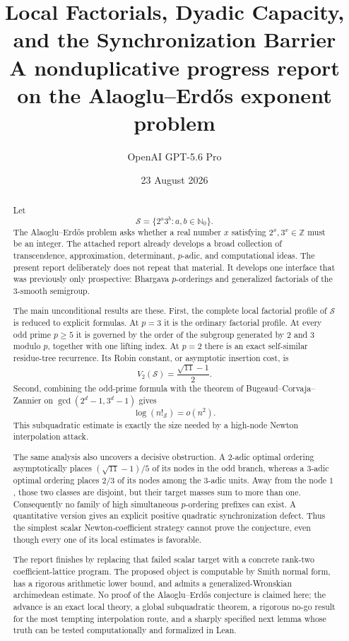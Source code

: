 \documentclass[11pt]{article}
\title{\textbf{Local Factorials, Dyadic Capacity, and the Synchronization Barrier}\\[0.4em]
\large A nonduplicative progress report on the Alaoglu--Erd\H{o}s exponent problem}
\author{OpenAI GPT-5.6 Pro}
\date{23 August 2026}
\theoremstyle{definition}
\theoremstyle{remark}
\newcommand{\N}{\mathbb N}
\newcommand{\Z}{\mathbb Z}
\newcommand{\calS}{\mathcal S}
\begin{document}
\maketitle

\begin{abstract}
Let
\[
   \calS=\{2^a3^b:a,b\in\N_0\}.
\]
The Alaoglu--Erd\H{o}s problem asks whether a real number $x$ satisfying
$2^x,3^x\in\Z$ must be an integer.  The attached report already develops a broad collection of transcendence, approximation, determinant, $p$-adic, and computational ideas.  The present report deliberately does not repeat that material.  It develops one interface that was previously only prospective: Bhargava $p$-orderings and generalized factorials of the $3$-smooth semigroup.

The main unconditional results are these.  First, the complete local factorial profile of $\calS$ is reduced to explicit formulas.  At $p=3$ it is the ordinary factorial profile.  At every odd prime $p\ge5$ it is governed by the order of the subgroup generated by $2$ and $3$ modulo $p$, together with one lifting index.  At $p=2$ there is an exact self-similar residue-tree recurrence.  Its Robin constant, or asymptotic insertion cost, is
\[
        V_2(\calS)=\frac{\sqrt{11}-1}{2}.
\]
Second, combining the odd-prime formula with the theorem of Bugeaud--Corvaja--Zannier on
$\gcd(2^d-1,3^d-1)$ gives
\[
        \log(n!_{\calS})=o(n^2).
\]
This subquadratic estimate is exactly the size needed by a high-node Newton interpolation attack.

The same analysis also uncovers a decisive obstruction.  A $2$-adic optimal ordering asymptotically places
$(\sqrt{11}-1)/5$ of its nodes in the odd branch, whereas a $3$-adic optimal ordering places $2/3$ of its nodes among the $3$-adic units.  Away from the node $1$, those two classes are disjoint, but their target masses sum to more than one.  Consequently no family of high simultaneous $p$-ordering prefixes can exist.  A quantitative version gives an explicit positive quadratic synchronization defect.  Thus the simplest scalar Newton-coefficient strategy cannot prove the conjecture, even though every one of its local estimates is favorable.

The report finishes by replacing that failed scalar target with a concrete rank-two coefficient-lattice program.  The proposed object is computable by Smith normal form, has a rigorous arithmetic lower bound, and admits a generalized-Wronskian archimedean estimate.  No proof of the Alaoglu--Erd\H{o}s conjecture is claimed here; the advance is an exact local theory, a global subquadratic theorem, a rigorous no-go result for the most tempting interpolation route, and a sharply specified next lemma whose truth can be tested computationally and formalized in Lean.
\end{abstract}
\end{document}
